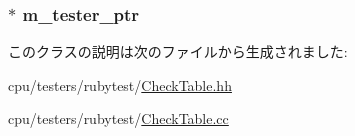 \label{classCheckTable_aedeaccd67403213e1e43d99ff1c70f44}
\hypertarget{classCheckTable_aaff3af064462a4d4b7f986a4a2454ff0}{
\subsubsection[{m\_\-tester\_\-ptr}]{$\ast$ {\bf m\_\-tester\_\-ptr}}}
\label{classCheckTable_aaff3af064462a4d4b7f986a4a2454ff0}


このクラスの説明は次のファイルから生成されました:\begin{DoxyCompactItemize}
\item 
cpu/testers/rubytest/\hyperlink{CheckTable_8hh}{CheckTable.hh}\item 
cpu/testers/rubytest/\hyperlink{CheckTable_8cc}{CheckTable.cc}\end{DoxyCompactItemize}
